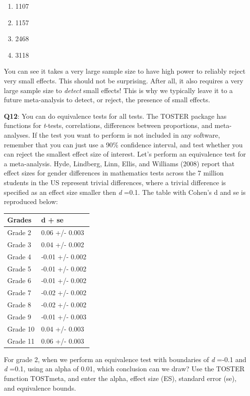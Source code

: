\documentclass[
  oneside]{book}
\providecommand{\tightlist}{%
  \setlength{\itemsep}{0pt}\setlength{\parskip}{0pt}}
\begin{document}
\begin{enumerate}
\def\labelenumi{\Alph{enumi})}
\tightlist
\item
  1107
\item
  1157
\item
  2468
\item
  3118
\end{enumerate}

You can see it takes a very large sample size to have high power to reliably reject very small effects. This should not be surprising. After all, it also requires a very large sample size to \emph{detect} small effects! This is why we typically leave it to a future meta-analysis to detect, or reject, the presence of small effects.

\textbf{Q12}: You can do equivalence tests for all tests. The TOSTER package has functions for \emph{t}-tests, correlations, differences between proportions, and meta-analyses. If the test you want to perform is not included in any software, remember that you can just use a 90\% confidence interval, and test whether you can reject the smallest effect size of interest. Let's perform an equivalence test for a meta-analysis. Hyde, Lindberg, Linn, Ellis, and Williams (2008) report that effect sizes for gender differences
in mathematics tests across the 7 million students in the US represent trivial differences, where a trivial difference is specified as an effect size smaller then \emph{d} =0.1. The table with Cohen's d and se is reproduced below:

\begin{longtable}[]{@{}ll@{}}
\toprule
\textbf{Grades} & \textbf{d + se} \\
\midrule
\endhead
Grade 2 & 0.06 +/- 0.003 \\
Grade 3 & 0.04 +/- 0.002 \\
Grade 4 & -0.01 +/- 0.002 \\
Grade 5 & -0.01 +/- 0.002 \\
Grade 6 & -0.01 +/- 0.002 \\
Grade 7 & -0.02 +/- 0.002 \\
Grade 8 & -0.02 +/- 0.002 \\
Grade 9 & -0.01 +/- 0.003 \\
Grade 10 & 0.04 +/- 0.003 \\
Grade 11 & 0.06 +/- 0.003 \\
\bottomrule
\end{longtable}

For grade 2, when we perform an equivalence test with boundaries of \emph{d} =-0.1 and \emph{d} =0.1, using an alpha of 0.01, which conclusion can we draw? Use the TOSTER function TOSTmeta, and enter the alpha, effect size (ES), standard error (se), and equivalence bounds.
\end{document}
